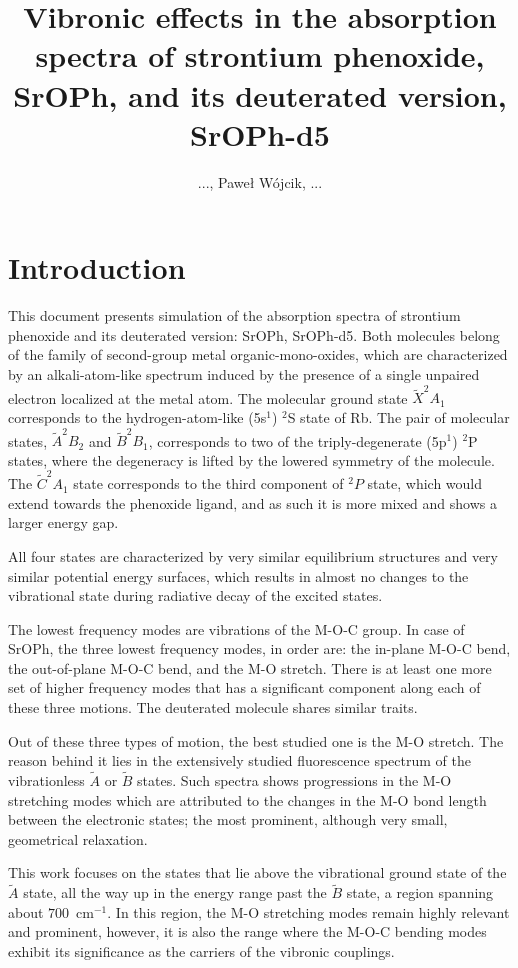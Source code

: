 \documentclass{article}
\title{
    Vibronic effects in the absorption spectra of strontium phenoxide, SrOPh,
    and its deuterated version, SrOPh-d5
}
\author{..., Paweł Wójcik, ...}
\begin{document}
\maketitle

\section{Introduction}
\label{sec:intro}

This document presents simulation of the absorption spectra of strontium
phenoxide and its deuterated version: SrOPh, SrOPh-d5. Both molecules belong of
the family of second-group metal organic-mono-oxides, which are characterized
by an alkali-atom-like spectrum induced by the presence of a single unpaired
electron localized at the metal atom. The molecular ground state $\tilde{X}^2 A
_1$ corresponds to the hydrogen-atom-like (5s$^1$) $^2$S state of Rb. The pair
of molecular states, $\tilde{A} ^2 B_{2}$ and $\tilde{B} ^2 B _{1}$,
corresponds to two of the triply-degenerate (5p$^1$) $^2$P states, where the
degeneracy is lifted by the lowered symmetry of the molecule. The $\tilde{C} ^2
A _1$ state corresponds to the third component of $^2 P$ state, which would
extend towards the phenoxide ligand, and as such it is more mixed and shows a
larger energy gap.

All four states are characterized by very similar equilibrium structures and
very similar potential energy surfaces, which results in almost no changes to
the vibrational state during radiative decay of the excited states. 

The lowest frequency modes are vibrations of the M-O-C group. In case of SrOPh,
the three lowest frequency modes, in order are: the in-plane M-O-C bend, the
out-of-plane M-O-C bend, and the M-O stretch. There is at least one more set of
higher frequency modes that has a significant component along each of these
three motions. The deuterated molecule shares similar traits.

Out of these three types of motion, the best studied one is the M-O stretch.
The reason behind it lies in the extensively studied fluorescence spectrum of
the vibrationless $\tilde{A}$ or $\tilde{B}$ states. Such spectra shows
progressions in the M-O stretching modes which are attributed to the changes in
the M-O bond length between the electronic states; the most prominent, although
very small, geometrical relaxation.

This work focuses on the states that lie above the vibrational ground state of
the $\tilde{A}$ state, all the way up in the energy range past the $\tilde{B}$
state, a region spanning about $700$~cm$^{-1}$. In this region, the M-O
stretching modes remain highly relevant and prominent, however, it is also the
range where the M-O-C bending modes exhibit its significance as the carriers of
the vibronic couplings. 
\end{document}
